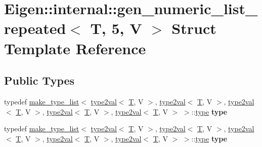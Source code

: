 \hypertarget{struct_eigen_1_1internal_1_1gen__numeric__list__repeated_3_01_t_00_015_00_01_v_01_4}{}\section{Eigen\+:\+:internal\+:\+:gen\+\_\+numeric\+\_\+list\+\_\+repeated$<$ T, 5, V $>$ Struct Template Reference}
\label{struct_eigen_1_1internal_1_1gen__numeric__list__repeated_3_01_t_00_015_00_01_v_01_4}
\subsection*{Public Types}
\begin{DoxyCompactItemize}
\item 
\mbox{\label{struct_eigen_1_1internal_1_1gen__numeric__list__repeated_3_01_t_00_015_00_01_v_01_4_ac093161496208cb4e9213afdc04976b6}} 
typedef \hyperlink{struct_eigen_1_1internal_1_1make__type__list}{make\+\_\+type\+\_\+list}$<$ \hyperlink{struct_eigen_1_1internal_1_1type2val}{type2val}$<$ \hyperlink{group___sparse_core___module}{T}, V $>$, \hyperlink{struct_eigen_1_1internal_1_1type2val}{type2val}$<$ \hyperlink{group___sparse_core___module}{T}, V $>$, \hyperlink{struct_eigen_1_1internal_1_1type2val}{type2val}$<$ \hyperlink{group___sparse_core___module}{T}, V $>$, \hyperlink{struct_eigen_1_1internal_1_1type2val}{type2val}$<$ \hyperlink{group___sparse_core___module}{T}, V $>$, \hyperlink{struct_eigen_1_1internal_1_1type2val}{type2val}$<$ \hyperlink{group___sparse_core___module}{T}, V $>$ $>$\+::\hyperlink{struct_eigen_1_1internal_1_1type__list}{type} {\bfseries type}
\item 
\mbox{\label{struct_eigen_1_1internal_1_1gen__numeric__list__repeated_3_01_t_00_015_00_01_v_01_4_ac093161496208cb4e9213afdc04976b6}} 
typedef \hyperlink{struct_eigen_1_1internal_1_1make__type__list}{make\+\_\+type\+\_\+list}$<$ \hyperlink{struct_eigen_1_1internal_1_1type2val}{type2val}$<$ \hyperlink{group___sparse_core___module}{T}, V $>$, \hyperlink{struct_eigen_1_1internal_1_1type2val}{type2val}$<$ \hyperlink{group___sparse_core___module}{T}, V $>$, \hyperlink{struct_eigen_1_1internal_1_1type2val}{type2val}$<$ \hyperlink{group___sparse_core___module}{T}, V $>$, \hyperlink{struct_eigen_1_1internal_1_1type2val}{type2val}$<$ \hyperlink{group___sparse_core___module}{T}, V $>$, \hyperlink{struct_eigen_1_1internal_1_1type2val}{type2val}$<$ \hyperlink{group___sparse_core___module}{T}, V $>$ $>$\+::\hyperlink{struct_eigen_1_1internal_1_1type__list}{type} {\bfseries type}
\end{DoxyCompactItemize}


